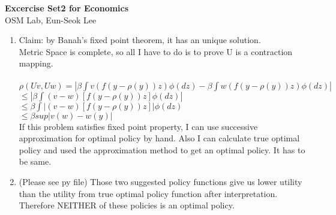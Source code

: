 \documentclass[letterpaper,12pt]{article}
\theoremstyle{definition}
\begin{document}
\begin{flushleft}
   \textbf{\large{Excercise Set2 for Economics}} \\[5pt]
   OSM Lab, Eun-Seok Lee \\[5pt]
 
\end{flushleft}

\vspace{5mm}

\begin{enumerate}

       

	\item Claim: by Banah's fixed point theorem, it has an unique solution.\\
		 Metric Space is complete, so all I have to do is to prove U is a contraction mapping.\\ \\
		$\rho(Uv,Uw) = |\beta \int v(f(y-\rho(y))z)\phi(dz) - \beta \int w(f(y-\rho(y))z)\phi(dz)| $ \\
	\phantom{------------ }			  $\leq |\beta \int (v-w)[f(y-\rho(y))z]\phi(dz)| $ \\
	\phantom{------------ }			  $\leq \beta \int |(v-w)[f(y-\rho(y))z]|\phi(dz) $  \\
	\phantom{------------ }			  $\leq \beta sup|v(w)-w(y)|$ \\
                                  
		If this problem satisfies fixed point property, I can use successive approximation for optimal policy by hand. Also I can calculate true optimal policy and used the approximation method to get an optimal policy. It has to be same.

   		
   	\item (Please see py file) Those two suggested policy functions give us lower utility than the utility from true optimal policy function after interpretation. Therefore NEITHER of these policies is an optimal policy.
\end{enumerate}

\vspace{25mm}
\end{document}

